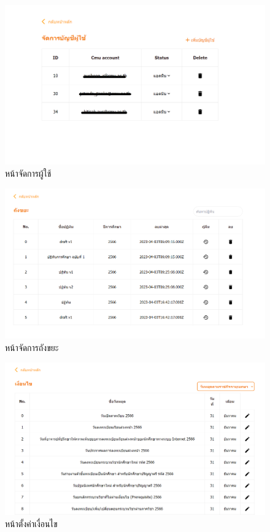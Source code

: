 \begin{figure}[h]
  \centering
  \includegraphics[width= 1\textwidth]{edit-user.png}
  \caption{หน้าจัดการผู้ใช้}
  \label{fig: edit-user}
\end{figure}
\begin{figure}[h]
  \centering
  \includegraphics[width= 1\textwidth]{edit-delete.png}
  \caption{หน้าจัดการถังขยะ}
  \label{fig: edit-delete}
\end{figure}
\begin{figure}[h]
  \centering
  \includegraphics[width= 1\textwidth]{edit-condition.png}
  \caption{หน้าตั้งค่าเงื่อนไข}
  \label{fig: edit-condition}
\end{figure}
\clearpage

